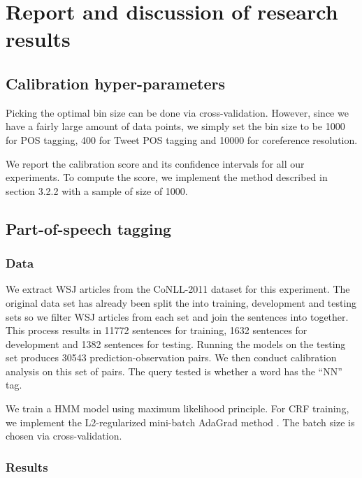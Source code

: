 \chapter{Report and discussion of research results}

\section{Calibration hyper-parameters}

Picking the optimal bin size can be done via cross-validation. However, since we have a fairly large amount of data points, we simply set the bin size to be 1000 for POS tagging, 400 for Tweet POS tagging and 10000 for coreference resolution. 

We report the calibration score and its confidence intervals for all our experiments. To compute the score, we implement the method described in section 3.2.2 with a sample of size of 1000.

\section{Part-of-speech tagging}

\subsection{Data}

We extract WSJ articles from the CoNLL-2011 dataset for this experiment. The original data set has already been split the into training, development and testing sets so we filter WSJ articles from each set and join the sentences into together. This process results in 11772 sentences for training, 1632 sentences for development and 1382 sentences for testing. Running the models on the testing set produces 30543 prediction-observation pairs. We then conduct calibration analysis on this set of pairs. The query tested is whether a word has the ``NN'' tag. 

We train a HMM model using maximum likelihood principle. For CRF training, we implement the L2-regularized mini-batch AdaGrad method \citep{duchi2011adaptive}. The batch size is chosen via cross-validation.   

\subsection{Results}

